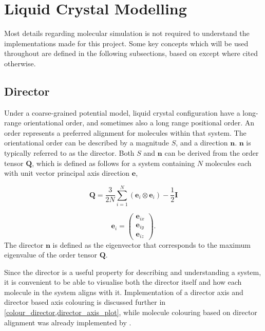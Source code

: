 \section{Liquid Crystal Modelling}
Most details regarding molecular simulation is not required to understand the implementations made for this project. Some key concepts which will be used throughout are defined in the following subsections, based on \textcite{allen2017computer} except where cited otherwise.
\subsection{Director}
\label{director_explain}
Under a coarse-grained potential model, liquid crystal configuration have a long-range orientational order, and sometimes also a long range positional order. An order represents a preferred alignment for molecules within that system\cite{dong1997orientational}. The orientational order can be described by a magnitude $S$, and a direction $\mathbf{n}$. $\mathbf{n}$ is typically referred to as the director. Both $S$ and $\mathbf{n}$ can be derived from the order tensor $\mathbf{Q}$, which is defined as follows for a system containing $N$ molecules each with unit vector principal axis direction $\mathbf{e}$,

\begin{equation}
\mathbf{Q}=
\frac{3}{2N}
\sum_{i=1}^{N}
(\mathbf{e}_i
\otimes
\mathbf{e}_i)
-\frac{1}{2}\mathbf{I}
\end{equation}

\begin{equation}
\mathbf{e}_i=\begin{pmatrix}
  \mathbf{e}_{ix}\\
  \mathbf{e}_{iy}\\
  \mathbf{e}_{iz}
\end{pmatrix}.
\label{order_tensor_e}
\end{equation}
The director $\mathbf{n}$ is defined as the eigenvector that corresponds to the maximum eigenvalue of the order tensor $\mathbf{Q}$.

Since the director is a useful property for describing and understanding a system, it is convenient to be able to visualise both the director itself and how each molecule in the system aligns with it. Implementation of a director axis and director based axis colouring is discussed further in \cref{colour_director,director_axis_plot}, while molecule colouring based on director alignment was already implemented by \textcite{Battistini_2021}.

